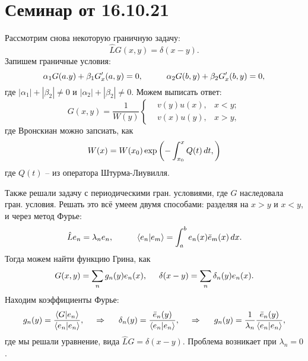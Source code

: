 \section{Семинар от 16.10.21}

Рассмотрим снова некоторую граничную задачу:
\begin{equation*}
    \hat{L} G(x, y) = \delta(x-y).
\end{equation*}
Запишем граничные условия:
\begin{equation*}
    \alpha_1 G(a. y) + \beta_1 G'_x(a, y) = 0,
    \hspace{10 mm} 
    \alpha_2 G(b, y) + \beta_2 G'_x (b, y) = 0,
\end{equation*}
где  $|\alpha_1| + |\beta_2| \neq 0$ и $|\alpha_2| + |\beta_2| \neq 0$.
Можем выписать ответ:
\begin{equation*}
    G(x, y) = \frac{1}{W(y)} \left\{\begin{aligned}
        &v(y) u(x), &x < y; \\
        &v(x) u(y), &x > y,
    \end{aligned}\right.
\end{equation*}
где Вронскиан можно запсиать, как
\begin{equation*}
    W(x) = W(x_0) \exp\left(
        - \int_{x_0}^{x}  Q(t) \, d t,
    \right)
\end{equation*}
где $Q(t)$ -- из оператора Штурма-Лиувилля. 

Также решали задачу с периодическими гран. условиями, где $G$ наследовала гран. условия. 
Решать это всё умеем двумя способами: разделяя на $x  > y$ и $x < y$, и через метод Фурье:
\begin{equation*}
    \hat{L} e_n  = \lambda_n e_n,
    \hspace{10 mm} 
    \langle e_n | e_m \rangle = \int_{a}^{b} e_n (x) \bar{e}_m(x)  \d x.
\end{equation*}
Тогда можем найти функцию Грина, как
\begin{equation*}
    G(x, y) = \sum_n g_n (y) e_n (x),
    \hspace{5 mm} 
    \delta(x-y) = \sum_n \delta_n ( y) e_n (x).
\end{equation*}
Находим коэффициенты Фурье:
\begin{equation*}
    g_n (y) = 
    \frac{\langle G | e_n\rangle}{\langle e_n | e_n\rangle},
    \hspace{0.5cm} \Rightarrow \hspace{0.5cm}
    \delta_n (y) = \frac{\bar{e}_n (y)}{\langle e_n | e_n\rangle},
    \hspace{0.5cm} \Rightarrow \hspace{0.5cm}
    g_n (y) = \frac{1}{\lambda_n} \frac{\bar{e}_n (y)}{\langle e_n | e_n\rangle},
\end{equation*}
где мы решали уравнение, вида $\hat{L} G = \delta(x-y)$. 
Проблема возникает при $\lambda_n = 0$. 



